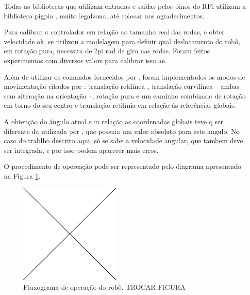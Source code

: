Todas as bibliotecas que utilizam entradas e saídas pelos pinos do RPi utilizam a biblioteca pigpio \cite{pigpio}, muito legalzona, até colocar nos agradecimentos.

Para calibrar o controlador em relação ao tamanho real das rodas, e obter velocidade ok, se utilizou a modelagem para definir qual deslocamento do robô, em rotação pura, necessita de 2pi rad de giro nas rodas. Foram feitos experimentos com diversos valors para calibrar isso ae.

Além de utilizar os comandos fornecidos por \cite{ritter2016modelagem}, foram implementados os modos de movimentação citados por \cite{loh2003mechatronics}: translação retilínea , translação curvilínea -- ambas sem alteração na orientação --, rotação pura e um caminho combinado de rotação em torno do seu centro e translação retilínia em relação às referências globais.

A obtenção do ângulo atual e m relação as coordenadas globais teve q ser diferente da utilizada por \cite{ritter2016modelagem}, que possuia um valor absoluto para este angulo. No caso do trablho descrito aqui, só se sabe a velocidade angular, que tambem deve ser integrada, e por isso podem aparecer mais erros.

O procedimento de opereação pode ser representado pelo diagrama apresentado na Figura \ref{fig:operation}.


\begin{figure}[h]
  \centering
  \includegraphics[width = 0.45\textwidth]{imagens/edc}
  \caption{Fluxograma de operação do robô. TROCAR FIGURA}
  \label{fig:operation}
\end{figure}


